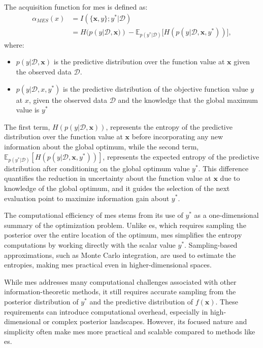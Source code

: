 The acquisition function for \ac{mes} is defined as:
\begin{equation*}
\begin{split}
    \alpha_{MES}(x) &= I(\{\mathbf{x}, y\}; y^* \vert \mathcal{D}) 
\\
    &= H(p(y \vert \mathcal{D}, \mathbf{x)}) - \mathbb{E}_{p(y^* \vert \mathcal{D})}\big[ H(p(y \vert \mathcal{D}, \mathbf{x}, y^*)) \big],
\end{split}
\end{equation*}
where:
\begin{itemize}
    \item $p(y \vert \mathcal{D}, \mathbf{x})$ is the predictive distribution over the function value at $\mathbf{x}$ given the observed data $\mathcal{D}$.
    \item \(p(y \vert \mathcal{D}, x, y^*)\) is the predictive distribution of the objective function value \(y\) at \(x\), given the observed data \(\mathcal{D}\) and the knowledge that the global maximum value is \(y^*\)

\end{itemize}

The first term, \(H(p(y \vert \mathcal{D}, \mathbf{x}))\), represents the entropy of the predictive distribution over the function value at \(\mathbf{x}\) before incorporating any new information about the global optimum, while the second term, \(\mathbb{E}_{p(y^* \vert \mathcal{D})}\left[ H(p(y \vert \mathcal{D}, \mathbf{x}, y^*)) \right]\), represents the expected entropy of the predictive distribution after conditioning on the global optimum value \(y^*\). This difference quantifies the reduction in uncertainty about the function value at \(\mathbf{x}\) due to knowledge of the global optimum, and it guides the selection of the next evaluation point to maximize information gain about \(y^*\).
 

The computational efficiency of \ac{mes} stems from its use of $y^*$ as a one-dimensional summary of the optimization problem. Unlike \ac{es}, which requires sampling the posterior over the entire location of the optimum, \ac{mes} simplifies the entropy computations by working directly with the scalar value $y^*$. Sampling-based approximations, such as Monte Carlo integration, are used to estimate the entropies, making \ac{mes} practical even in higher-dimensional spaces.

While \ac{mes} addresses many computational challenges associated with other information-theoretic methods, it still requires accurate sampling from the posterior distribution of $y^*$ and the predictive distribution of $f(\mathbf{x})$. These requirements can introduce computational overhead, especially in high-dimensional or complex posterior landscapes. However, its focused nature and simplicity often make \ac{mes} more practical and scalable compared to methods like \ac{es}.
